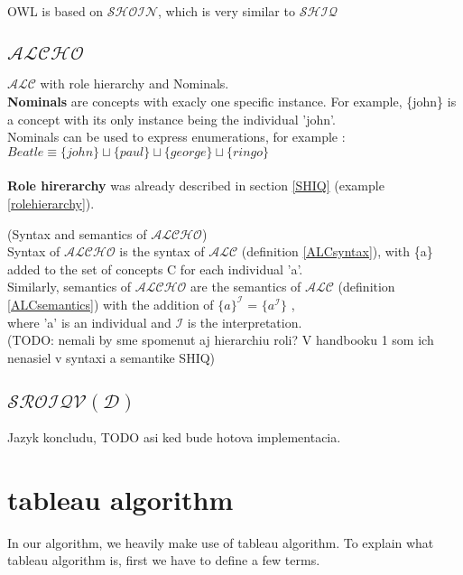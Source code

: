 OWL is based on $\mathcal{SHOIN}$, which is very similar to $\mathcal{SHIQ}$

\subsection{$\mathcal{ALCHO}$}
$\mathcal{ALC}$ with role hierarchy and Nominals.\\
\textbf{Nominals} are concepts with exacly one specific instance. For example, \{john\} is a concept with its only instance being the individual 'john'. \\
Nominals can be used to express enumerations, for example \cite{primer}: \\
   $Beatle \equiv \{john\} \sqcup  \{paul\} \sqcup  \{george\} \sqcup  \{ringo\} $\\
\\
\textbf{Role hirerarchy} was already described in section \ref{SHIQ} (example \ref{rolehierarchy}).
\begin{mydef} (Syntax and semantics of $\mathcal{ALCHO}$)\\
	Syntax of $\mathcal{ALCHO}$ is the syntax of $\mathcal{ALC}$ (definition \ref{ALCsyntax}), with \{a\} added to the set of concepts C for each individual 'a'.\\
	Similarly, semantics of $\mathcal{ALCHO}$ are the semantics of $\mathcal{ALC}$ (definition \ref{ALCsemantics}) with the addition of 
     $\{a\}^\mathcal{I}$ = $ \{ a^\mathcal{I} \} $ ,\\ 
     where 'a' is an individual and $ \mathcal{I}$ is the interpretation. \\

(TODO: nemali by sme spomenut aj hierarchiu roli? V handbooku 1 \cite{handbook} som ich nenasiel v syntaxi a semantike SHIQ)
\end{mydef}
\subsection{$\mathcal{SROIQV(D)}$}
Jazyk koncludu, TODO asi ked bude hotova implementacia.
\section{tableau algorithm}

In our algorithm, we heavily make use of tableau algorithm. To explain what tableau algorithm is, first we have to define a few terms.


